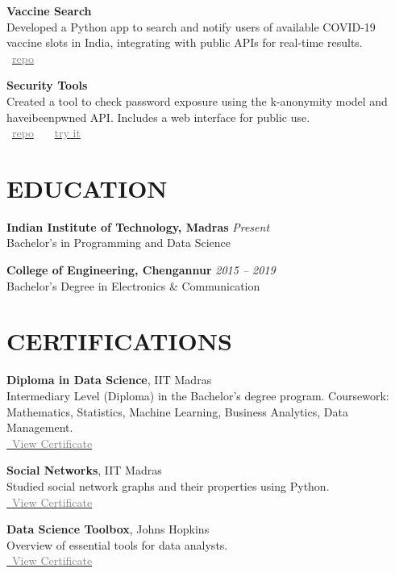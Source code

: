 \documentclass[11pt,a4paper]{article}
\begin{document}
\textbf{Vaccine Search} \\
Developed a Python app to search and notify users of available COVID-19 vaccine slots in India, integrating with public APIs for real-time results. \\
\faGithub~\href{https://github.com/jishnujp/vaccine_search}{\textcolor{gray}{repo}} 

\textbf{Security Tools} \\
Created a tool to check password exposure using the k-anonymity model and haveibeenpwned API. Includes a web interface for public use. \\
\faGithub~\href{https://github.com/jishnujp/securityTools}{\textcolor{gray}{repo}} \, \textbar{} \,
\faGlobe~\href{https://jishnujp.github.io/securityTools}{\textcolor{gray}{try it}} 

\section*{EDUCATION}
\textbf{Indian Institute of Technology, Madras} \hfill \textit{Present} \\
Bachelor's in Programming and Data Science

\textbf{College of Engineering, Chengannur} \hfill \textit{2015 -- 2019} \\
Bachelor's Degree in Electronics \& Communication

\section*{CERTIFICATIONS}
\textbf{Diploma in Data Science}, IIT Madras \\
Intermediary Level (Diploma) in the Bachelor's degree program. Coursework: Mathematics, Statistics, Machine Learning, Business Analytics, Data Management. \\
\href{https://jishnujp.github.io/certificates/data_science_diploma.pdf}{\faFilePdfO~\textcolor{gray}{View Certificate}}

\textbf{Social Networks}, IIT Madras \\
Studied social network graphs and their properties using Python. \\
\href{https://archive.nptel.ac.in/content/noc/NOC22/SEM1/Ecertificates/106/noc22-cs30/Course/NPTEL22CS30S4373058402018648.jpg}{\faFilePdfO~\textcolor{gray}{View Certificate}}

\textbf{Data Science Toolbox}, Johns Hopkins \\
Overview of essential tools for data analysts. \\
\href{https://coursera.org/share/bd0023b71386ae9c7246bad3d5b566a7}{\faFilePdfO~\textcolor{gray}{View Certificate}}
\end{document}
